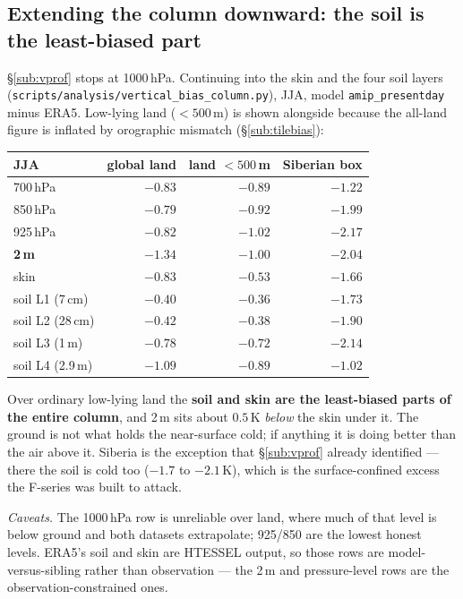 \documentclass[10pt]{article}
\begin{document}
\subsection{Extending the column downward: the soil is the least-biased part}\label{sub:soilcol}
\S\ref{sub:vprof} stops at 1000\,hPa. Continuing into the skin and the four soil layers
(\texttt{scripts/analysis/vertical\_bias\_column.py}), JJA, model \texttt{amip\_presentday}
minus ERA5. Low-lying land ($<500$\,m) is shown alongside because the all-land figure is
inflated by orographic mismatch (\S\ref{sub:tilebias}):

\begin{center}\footnotesize
\begin{tabular}{l r r r}
\toprule
JJA & global land & land $<500$\,m & Siberian box \\
\midrule
700\,hPa & $-0.83$ & $-0.89$ & $-1.22$ \\
850\,hPa & $-0.79$ & $-0.92$ & $-1.99$ \\
925\,hPa & $-0.82$ & $-1.02$ & $-2.17$ \\
\textbf{2\,m} & $-1.34$ & $\mathbf{-1.00}$ & $-2.04$ \\
skin & $-0.83$ & $\mathbf{-0.53}$ & $-1.66$ \\
soil L1 (7\,cm) & $-0.40$ & $\mathbf{-0.36}$ & $-1.73$ \\
soil L2 (28\,cm) & $-0.42$ & $-0.38$ & $-1.90$ \\
soil L3 (1\,m) & $-0.78$ & $-0.72$ & $-2.14$ \\
soil L4 (2.9\,m) & $-1.09$ & $-0.89$ & $-1.02$ \\
\bottomrule
\end{tabular}
\end{center}

\noindent Over ordinary low-lying land the \textbf{soil and skin are the least-biased parts of
the entire column}, and 2\,m sits about $0.5$\,K \emph{below} the skin under it. The ground is
not what holds the near-surface cold; if anything it is doing better than the air above it.
Siberia is the exception that \S\ref{sub:vprof} already identified --- there the soil is cold
too ($-1.7$ to $-2.1$\,K), which is the surface-confined excess the F-series was built to
attack.

\emph{Caveats.} The 1000\,hPa row is unreliable over land, where much of that level is below
ground and both datasets extrapolate; 925/850 are the lowest honest levels. ERA5's soil and
skin are HTESSEL output, so those rows are model-versus-sibling rather than observation --- the
2\,m and pressure-level rows are the observation-constrained ones.
\end{document}
